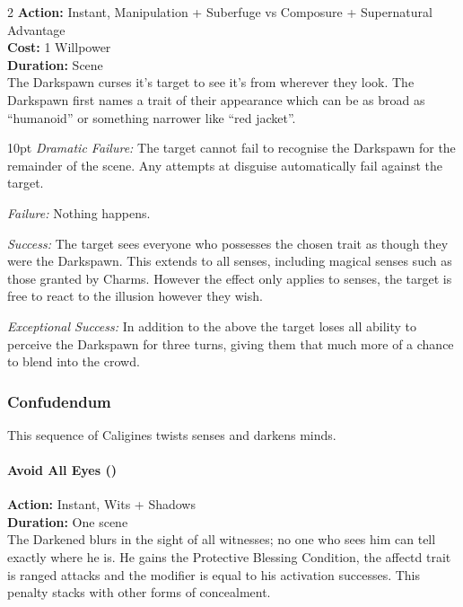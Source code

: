 \begin{multicols}{2}
\noindent \textbf{Action:} Instant, Manipulation + Suberfuge vs Composure + Supernatural Advantage\\

\noindent \textbf{Cost:} 1 Willpower\\

\noindent \textbf{Duration:} Scene \\

The Darkspawn curses it’s target to see it’s from wherever they look. The Darkspawn first names a trait of their appearance which can be as broad as “humanoid” or something narrower like “red jacket”.

\begin{myindentpar}{10pt} \emph{Dramatic Failure:} The target cannot fail to recognise the Darkspawn for the remainder of the scene. Any attempts at disguise automatically fail against the target. 

\emph{Failure:} Nothing happens.

\emph{Success:} The target sees everyone who possesses the chosen trait as though they were the Darkspawn. This extends to all senses, including magical senses such as those granted by Charms. However the effect only applies to senses, the target is free to react to the illusion however they wish. 

\emph{Exceptional Success:} In addition to the above the target loses all ability to perceive the Darkspawn for three turns, giving them that much more of a chance to blend into the crowd. \end{myindentpar}


\subsubsection*{Confudendum}

This sequence of Caligines twists senses and darkens minds.\\

\paragraph*{Avoid All Eyes (\textbullet)}

\noindent \textbf{Action:} Instant, Wits + Shadows\\

\noindent \textbf{Duration:} One scene\\

\noindent The Darkened blurs in the sight of all witnesses; no one who sees him can tell exactly where he is. He gains the Protective Blessing Condition, the affectd trait is ranged attacks and the modifier is equal to his activation successes. This penalty stacks with other forms of concealment.\\


\end{multicols}

